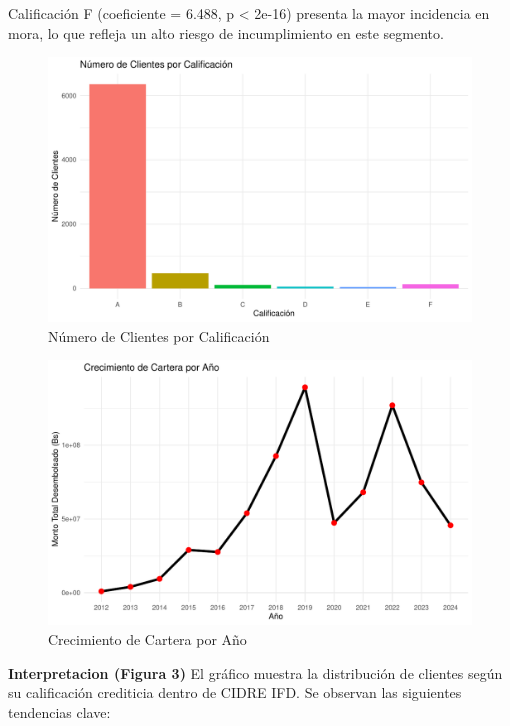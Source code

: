 \documentclass[Royal,times,sageh]{sagej}
\begin{document}
Calificación F (coeficiente = 6.488, p \textless{} 2e-16) presenta la
mayor incidencia en mora, lo que refleja un alto riesgo de
incumplimiento en este segmento.

\begin{figure}

{\centering \includegraphics[width=0.9\linewidth]{Mineria2_files/figure-latex/graficos_ajustados-1} 

}

\caption{Número de Clientes por Calificación}\label{fig:graficos_ajustados-1}
\end{figure}
\begin{figure}

{\centering \includegraphics[width=0.9\linewidth]{Mineria2_files/figure-latex/graficos_ajustados-2} 

}

\caption{Crecimiento de Cartera por Año}\label{fig:graficos_ajustados-2}
\end{figure}

\textbf{Interpretacion (Figura 3)} El gráfico muestra la distribución de
clientes según su calificación crediticia dentro de CIDRE IFD. Se
observan las siguientes tendencias clave:
\end{document}
